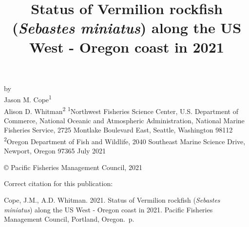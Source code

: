 \documentclass[11pt,
  english,
  a4paper,
]{article}
\date{}
\newcommand{\trTitle}{Status of Vermilion rockfish (\emph{Sebastes miniatus}) along the US West - Oregon coast in 2021}
\newcommand{\trYear}{2021}
\newcommand{\trMonth}{July}
\newcommand{\trAuthsBack}{Cope, J.M., A.D. Whitman}
\newcommand{\trCitation}{
\begin{hangparas}{1em}{1}
\trAuthsBack{}. \trYear{}. \trTitle{}. Pacific Fisheries Management Council, Portland, Oregon. \pageref{LastPage}{}\,p.
\end{hangparas}}
\begin{document}

\renewcommand*{\thefootnote}{\fnsymbol{footnote}}

\small
\thispagestyle{empty}
\noindent
\begin{center}
\title{Status of Vermilion rockfish (\emph{Sebastes miniatus}) along the US West - Oregon coast in 2021}
\vspace{1.5cm}
{\Large\textbf{}}
\vfill
by\\
Jason M. Cope\textsuperscript{1}\\
Alison D. Whitman\textsuperscript{2}\vfill
\textsuperscript{1}Northwest Fisheries Science Center, U.S. Department of Commerce, National Oceanic and Atmospheric Administration, National Marine Fisheries Service, 2725 Montlake Boulevard East, Seattle, Washington 98112\\
\textsuperscript{2}Oregon Department of Fish and Wildlife, 2040 Southeast Marine Science Drive, Newport, Oregon 97365\vfill
\trMonth{} \trYear{}
\end{center}
\clearpage

\thispagestyle{empty}
\vspace*{\fill}
\begin{center}
\copyright{} Pacific Fisheries Management Council, \trYear{}\\
\end{center}
\par
\bigskip
\noindent
Correct citation for this publication:
\bigskip
\par
\trCitation{}
\clearpage


\tableofcontents\clearpage
\label{TRlastRoman}
\clearpage

\newpage
\thispagestyle{empty} %

\pagestyle{plain}  %
\renewcommand*{\thefootnote}{\arabic{footnote}}  %
\setcounter{footnote}{0}  %
\renewcommand{\headrulewidth}{0.5pt}
\renewcommand{\footrulewidth}{0.5pt}
\end{document}
